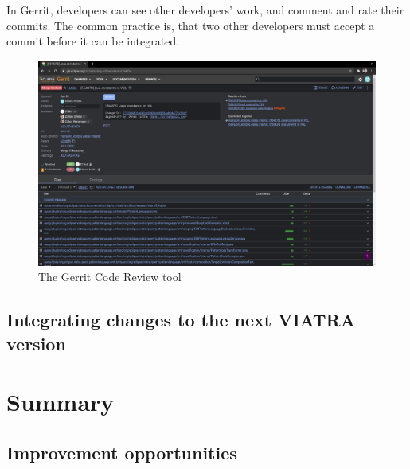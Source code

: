 \documentclass[11pt,a4paper,oneside]{report}
\begin{document}
In Gerrit, developers can see other developers' work, and comment and rate their
commits. The common practice is, that two other developers must accept a
commit before it can be integrated.

\begin{figure}[ht]
\centering
\includegraphics[width=150mm, keepaspectratio]{figures/gerrit.png}
\caption{The Gerrit Code Review tool}
\label{fig:gerrit}
\end{figure}

\section{Integrating changes to the next VIATRA version}

\chapter{Summary}

\section{Improvement opportunities}


\listoffigures{}
\listoftables{}

\nocite{*} %


\label{page:last}
\end{document}
